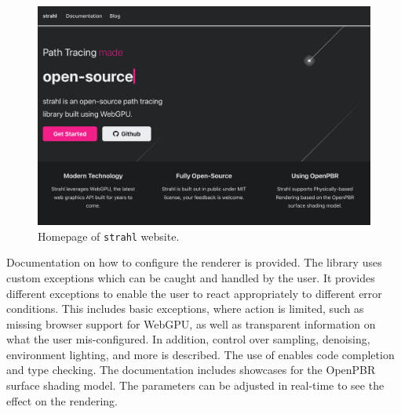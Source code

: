 \begin{figure}[H]
    \centering
    \includegraphics[width=0.7\columnwidth]{resources/website-home.png}
    \caption{Homepage of \texttt{strahl} website.}
    \label{fig:strahl-homepage}
\end{figure}

Documentation on how to configure the renderer is provided. The library uses custom exceptions which can be caught and handled by the user. It provides different exceptions to enable the user to react appropriately to different error conditions. This includes basic exceptions, where action is limited, such as missing browser support for \gls{WebGPU}, as well as transparent information on what the user mis-configured. In addition, control over sampling, denoising, environment lighting, and more is described. The use of  enables code completion and type checking. The documentation includes showcases for the \gls{OpenPBR} surface shading model. The parameters can be adjusted in real-time to see the effect on the rendering.

